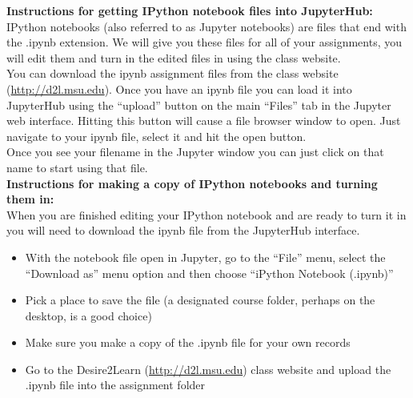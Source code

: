 \documentclass[oneside,letterpaper,11pt]{exam}
\begin{document}
{\noindent \textbf{Instructions for getting IPython notebook files into JupyterHub:}}\\[-5pt]

{\noindent IPython notebooks (also referred to as Jupyter notebooks) are files that end with the .ipynb extension. We will give you these files for all of your assignments, you will edit them and turn in the edited files in using the class website.}\\[-5pt]

{\noindent You can download the ipynb assignment files from the class website (\url{http://d2l.msu.edu}). Once you have an ipynb file you can load it into JupyterHub using the ``upload'' button on the main ``Files'' tab in the Jupyter web interface. Hitting this button will cause a file browser window to open. Just navigate to your ipynb file, select it and hit the open button.}\\[-5pt]

{\noindent Once you see your filename in the Jupyter window you can just click on that name to start using that file.}\\


{\noindent \textbf{Instructions for making a copy of IPython notebooks and turning them in:}}\\[-5pt]

{\noindent When you are finished editing your IPython notebook and are ready to turn it in you will need to download the ipynb file from the JupyterHub interface.}
\begin{itemize}
\item[1.] With the notebook file open in Jupyter, go to the ``File'' menu, select the ``Download as'' menu option and then choose ``iPython Notebook (.ipynb)'' \\[-15pt]
\item[2.] Pick a place to save the file (a designated course folder, perhaps on the desktop, is a good choice) \\[-15pt]
\item[3.] Make sure you make a copy of the .ipynb file for your own records \\[-15pt]
\item[4.] Go to the Desire2Learn (\url{http://d2l.msu.edu}) class website and upload the .ipynb file into the assignment folder 
\end{itemize}
\end{document}
